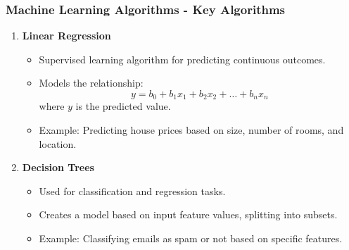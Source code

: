 \documentclass[aspectratio=169]{beamer}
\begin{document}
\begin{frame}[fragile]
    \frametitle{Machine Learning Algorithms - Key Algorithms}
    \begin{enumerate}
        \item \textbf{Linear Regression}
        \begin{itemize}
            \item Supervised learning algorithm for predicting continuous outcomes.
            \item Models the relationship: 
            \begin{equation}
                y = b_0 + b_1x_1 + b_2x_2 + \ldots + b_nx_n
            \end{equation}
            where \(y\) is the predicted value.
            \item Example: Predicting house prices based on size, number of rooms, and location.
        \end{itemize}
        \item \textbf{Decision Trees}
        \begin{itemize}
            \item Used for classification and regression tasks.
            \item Creates a model based on input feature values, splitting into subsets.
            \item Example: Classifying emails as spam or not based on specific features.
        \end{itemize}
    \end{enumerate}
\end{frame}
\end{document}
